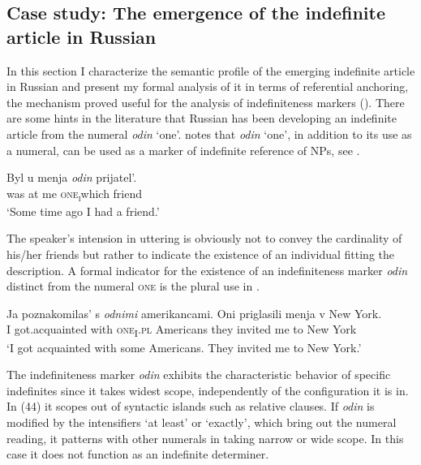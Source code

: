 \documentclass[output=paper,colorlinks,citecolor=brown]{langscibook}
\begin{document}
\subsection{Case study: The emergence of the indefinite article in Russian}\label{geist:sec:5.3}

In this section I characterize the semantic profile of the emerging indefinite article in Russian and present my formal analysis of it in terms of referential anchoring, the mechanism proved useful for the analysis of indefiniteness markers (). 
There are some hints in the literature that Russian has been developing an indefinite article from the numeral \textit{odin} ‘one’. \citet{Paduceva2010} notes that \textit{odin} ‘one’, in addition to its use as a numeral, can be used as a marker of indefinite reference of NPs, see .

\ea\label{geist:ex:odin-padu}
\gll Byl u menja \textit{odin} prijatel’.\\
was at me \textsc{one\textsubscript{i}}which friend\\
\glt ‘Some time ago I had a friend.’\hfill\citep[213]{Paduceva2010}
\z

\noindent The speaker’s intension in uttering  is obviously not to convey the cardinality of his/her friends but rather to indicate the existence of an individual fitting the description. A formal indicator for the existence of an indefiniteness marker \textit{odin} distinct from the numeral \textsc{one} is the plural use in .

\ea\label{geist:ex:odin-pl}
\gll Ja poznakomilas’ s \textit{odnimi} amerikancami. Oni priglasili menja v New York.\\
I got.acquainted with \textsc{one\textsubscript{I}.pl} Americans they invited me to New York\\
\glt ‘I got	acquainted with some Americans. They invited me to New York.’
\z

\noindent The indefiniteness marker \textit{odin} exhibits the characteristic behavior of specific indefinites since it takes widest scope, independently of the configuration it is in. In (44) it scopes out of syntactic islands such as relative clauses. If \textit{odin} is modified by the intensifiers `at least' or `exactly', which bring out the numeral reading, it patterns with other numerals in taking narrow or wide scope. In this case it does not function as an indefinite determiner.
\end{document}
